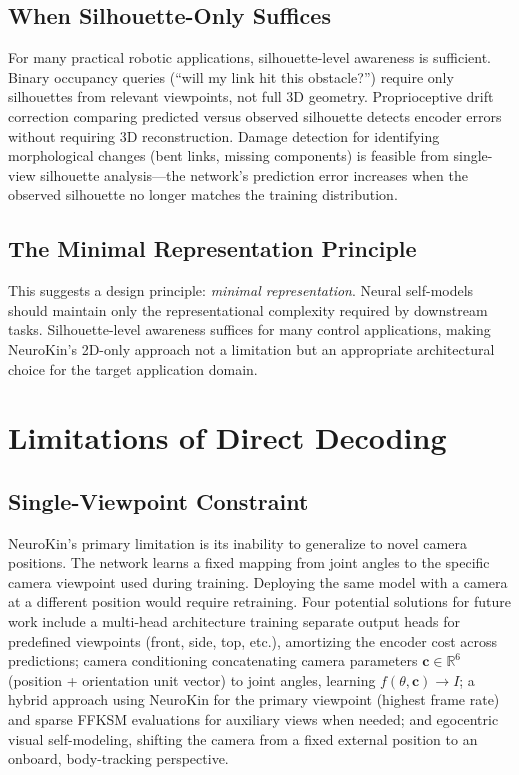 \documentclass[12pt,a4paper,oneside]{report}
\begin{document}
\subsection{When Silhouette-Only Suffices}

For many practical robotic applications, silhouette-level awareness is sufficient. Binary occupancy queries (``will my link hit this obstacle?'') require only silhouettes from relevant viewpoints, not full 3D geometry. Proprioceptive drift correction comparing predicted versus observed silhouette detects encoder errors without requiring 3D reconstruction. Damage detection for identifying morphological changes (bent links, missing components) is feasible from single-view silhouette analysis---the network's prediction error increases when the observed silhouette no longer matches the training distribution.

\subsection{The Minimal Representation Principle}

This suggests a design principle: \textit{minimal representation}. Neural self-models should maintain only the representational complexity required by downstream tasks. Silhouette-level awareness suffices for many control applications, making NeuroKin's 2D-only approach not a limitation but an appropriate architectural choice for the target application domain.

\section{Limitations of Direct Decoding}

\subsection{Single-Viewpoint Constraint}

NeuroKin's primary limitation is its inability to generalize to novel camera positions. The network learns a fixed mapping from joint angles to the specific camera viewpoint used during training. Deploying the same model with a camera at a different position would require retraining. Four potential solutions for future work include a multi-head architecture training separate output heads for predefined viewpoints (front, side, top, etc.), amortizing the encoder cost across predictions; camera conditioning concatenating camera parameters $\mathbf{c} \in \mathbb{R}^6$ (position + orientation unit vector) to joint angles, learning $f(\theta, \mathbf{c}) \rightarrow I$; a hybrid approach using NeuroKin for the primary viewpoint (highest frame rate) and sparse FFKSM evaluations for auxiliary views when needed; and egocentric visual self-modeling, shifting the camera from a fixed external position to an onboard, body-tracking perspective.
\end{document}
